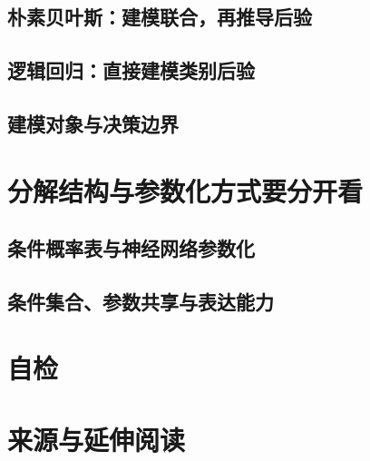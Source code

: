 \subsection{朴素贝叶斯：建模联合，再推导后验}
\label{subsec:prob-naive-bayes}
\contentplaceholder

\subsection{逻辑回归：直接建模类别后验}
\label{subsec:prob-logistic-regression}
\contentplaceholder

\subsection{建模对象与决策边界}
\label{subsec:prob-boundaries}
\contentplaceholder

\section{分解结构与参数化方式要分开看}
\label{sec:prob-parameterization}
\contentplaceholder

\subsection{条件概率表与神经网络参数化}
\label{subsec:prob-conditional-models}
\contentplaceholder

\subsection{条件集合、参数共享与表达能力}
\label{subsec:prob-complexity}
\contentplaceholder

\section{自检}
\label{sec:prob-review}
\contentplaceholder

\section{来源与延伸阅读}
\label{sec:prob-reading}
\contentplaceholder
